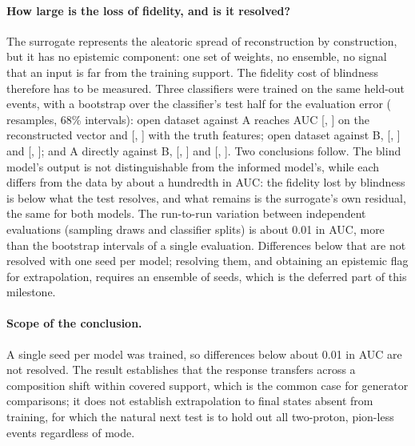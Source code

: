 \documentclass[11pt]{article}
\begin{document}
\paragraph{How large is the loss of fidelity, and is it resolved?} The surrogate represents the aleatoric
spread of reconstruction by construction, but it has no epistemic component: one set of weights, no ensemble,
no signal that an input is far from the training support. The fidelity cost of blindness therefore has to be
measured. Three classifiers were trained on the same \nHtest{} held-out events, with a bootstrap over the
classifier's test half for the evaluation error (\nUnBoot{} resamples, 68\% intervals): open dataset against A
reaches AUC \nUDAMarg{} [\nUDAMargLo{}, \nUDAMargHi{}] on the reconstructed vector and \nUDACond{}
[\nUDACondLo{}, \nUDACondHi{}] with the truth features; open dataset against B, \nUDBMarg{} [\nUDBMargLo{},
\nUDBMargHi{}] and \nUDBCond{} [\nUDBCondLo{}, \nUDBCondHi{}]; and A directly against B, \nUABMarg{}
[\nUABMargLo{}, \nUABMargHi{}] and \nUABCond{} [\nUABCondLo{}, \nUABCondHi{}]. Two conclusions follow. The
blind model's output is not distinguishable from the informed model's, while each differs from the data by
about a hundredth in AUC: the fidelity lost by blindness is below what the test resolves, and what remains is
the surrogate's own residual, the same for both models. The run-to-run variation between independent
evaluations (sampling draws and classifier splits) is about 0.01 in AUC, more than the bootstrap intervals of a
single evaluation. Differences below that are not resolved with one seed per model; resolving
them, and obtaining an epistemic flag for extrapolation, requires an ensemble of seeds, which is the deferred
part of this milestone.

\paragraph{Scope of the conclusion.} A single seed per model was trained, so differences below about 0.01 in
AUC are not resolved. The result establishes that the response transfers across a composition shift within
covered support, which is the common case for generator comparisons; it does not establish extrapolation to
final states absent from training, for which the natural next test is to hold out all two-proton, pion-less
events regardless of mode.
\end{document}
